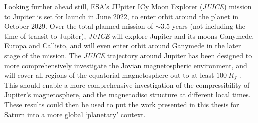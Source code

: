 Looking further ahead still, ESA's JUpiter ICy Moon Explorer (\textit{JUICE}) mission to Jupiter \citep{grasset2013} is set for launch in June 2022, to enter orbit around the planet in October 2029. Over the total planned mission of ${\sim}3.5$ years (not including the time of transit to Jupiter), \textit{JUICE} will explore Jupiter and its moons Ganymede, Europa and Callisto, and will even enter orbit around Ganymede in the later stage of the mission. The \textit{JUICE} trajectory around Jupiter has been designed to more comprehensively investigate the Jovian magnetospheric environment, and will cover all regions of the equatorial magnetosphere out to at least $\SI{100}{R_J}$ \citep{esa2014}. This should enable a more comprehensive investigation of the compressibility of Jupiter's magnetosphere, and the magnetodisc structure at different local times. These results could then be used to put the work presented in this thesis for Saturn into a more global `planetary' context.
%
%
%
%
%
%
%
%
%
%
%
%
%
%
%
%
%
%
%
%
%
%
%
%
%
%
%